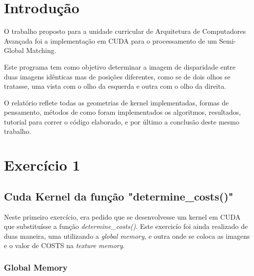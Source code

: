 \documentclass[pdftex,12pt,a4paper]{report}
\begin{document}
\renewcommand{\headrulewidth}{0pt}

\fancyhead{}
\fancyfoot{}
\rfoot{\thepage}

\renewcommand*\contentsname{Conteúdos}
\renewcommand*\figurename{Figura}
\renewcommand*\tablename{Tabela}

\tableofcontents
\renewcommand{\headrulewidth}{0.15pt}
\renewcommand{\thechapter}{}

\clearpage

\section{Introdução}

O trabalho proposto para a unidade curricular de Arquitetura de Computadores Avançada foi a implementação em CUDA para o processamento de um Semi-Global Matching. 

Este programa tem como objetivo determinar a imagem de disparidade entre duas imagens idênticas mas de posições diferentes, como se de dois olhos se tratasse, uma vista com o olho da esquerda e outra com o olho da direita.

O relatório reflete todas as geometrias de kernel implementadas, formas de pensamento, métodos de como foram implementados os algoritmos, resultados, tutorial para correr o código elaborado, e por último a conclusão deste mesmo trabalho.

\newpage
\section{Exercício 1}

\subsection{Cuda Kernel da função "determine\_costs()"}
Neste primeiro exercício, era pedido que se desenvolvesse um kernel em CUDA que substituísse a função \textit{determine\_costs()}.
Este exercicío foi ainda realizado de duas maneira, uma utilizando a \textit{global memory}, e outra onde se coloca as imagens e o valor de COSTS na \textit{texture memory}. 

\subsubsection{Global Memory}
\end{document}
